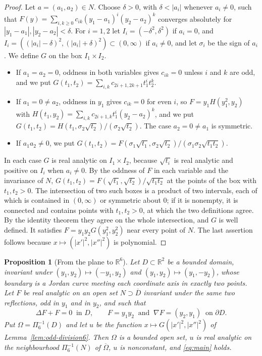 \documentclass[11pt]{amsart}
\newtheorem{proposition}[theorem]{Proposition}
\theoremstyle{definition}
\theoremstyle{remark}
\numberwithin{equation}{section}
\newcommand{\R}{\mathbb{R}}
\begin{document}
\begin{proof}
Let $a=(a_1,a_2)\in N$. Choose $\delta>0$, with $\delta<|a_i|$ whenever $a_i\neq0$, such that $F(y)=\sum_{i,k\geq0}c_{ik}(y_1-a_1)^i(y_2-a_2)^k$ converges absolutely for $|y_1-a_1|,|y_2-a_2|<\delta$. For $i=1,2$ let $I_i=(-\delta^2,\delta^2)$ if $a_i=0$, and $I_i=((|a_i|-\delta)^2,(|a_i|+\delta)^2)\subset(0,\infty)$ if $a_i\neq0$, and let $\sigma_i$ be the sign of $a_i$. We define $G$ on the box $I_1\times I_2$.
\begin{itemize}
\item If $a_1=a_2=0$, oddness in both variables gives $c_{ik}=0$ unless $i$ and $k$ are odd, and we put $G(t_1,t_2)=\sum_{i,k}c_{2i+1,2k+1}t_1^it_2^k$.
\item If $a_1=0\neq a_2$, oddness in $y_1$ gives $c_{ik}=0$ for even $i$, so $F=y_1H(y_1^2,y_2)$ with $H(t_1,y_2)=\sum_{i,k}c_{2i+1,k}t_1^i(y_2-a_2)^k$, and we put $G(t_1,t_2)=H(t_1,\sigma_2\sqrt{t_2})/(\sigma_2\sqrt{t_2})$. The case $a_2=0\neq a_1$ is symmetric.
\item If $a_1a_2\neq0$, we put $G(t_1,t_2)=F(\sigma_1\sqrt{t_1},\sigma_2\sqrt{t_2})/(\sigma_1\sigma_2\sqrt{t_1t_2})$.
\end{itemize}
In each case $G$ is real analytic on $I_1\times I_2$, because $\sqrt{t_i}$ is real analytic and positive on $I_i$ when $a_i\neq0$. By the oddness of $F$ in each variable and the invariance of $N$, $G(t_1,t_2)=F(\sqrt{t_1},\sqrt{t_2})/\sqrt{t_1t_2}$ at the points of the box with $t_1,t_2>0$. The intersection of two such boxes is a product of two intervals, each of which is contained in $(0,\infty)$ or symmetric about $0$; if it is nonempty, it is connected and contains points with $t_1,t_2>0$, at which the two definitions agree. By the identity theorem they agree on the whole intersection, and $G$ is well defined. It satisfies $F=y_1y_2G(y_1^2,y_2^2)$ near every point of $N$. The last assertion follows because $x\mapsto(|x'|^2,|x''|^2)$ is polynomial.
\end{proof}

\begin{proposition}[From the plane to $\R^6$]\label{prop:rotation6}
Let $D\subset\R^2$ be a bounded domain, invariant under $(y_1,y_2)\mapsto(-y_1,y_2)$ and $(y_1,y_2)\mapsto(y_1,-y_2)$, whose boundary is a Jordan curve meeting each coordinate axis in exactly two points. Let $F$ be real analytic on an open set $N\supset\overline D$ invariant under the same two reflections, odd in $y_1$ and in $y_2$, and such that
\begin{equation}\label{eq:P6}
\Delta F+F=0\ \text{ in }D,\qquad F=y_1y_2\ \text{ and }\ \nabla F=(y_2,y_1)\ \text{ on }\partial D .
\end{equation}
Put $\Omega=\Pi_6^{-1}(D)$ and let $u$ be the function $x\mapsto G(|x'|^2,|x''|^2)$ of Lemma~\ref{lem:odd-division6}. Then $\Omega$ is a bounded open set, $u$ is real analytic on the neighbourhood $\Pi_6^{-1}(N)$ of $\overline\Omega$, $u$ is nonconstant, and \eqref{eq:main} holds.
\end{proposition}
\end{document}
